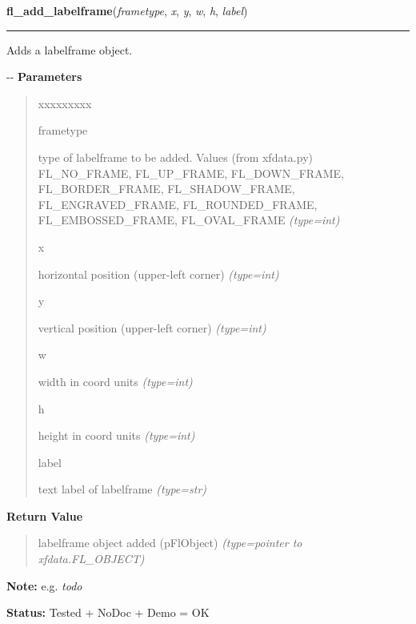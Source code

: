 \hspace{.8\funcindent}\begin{boxedminipage}{\funcwidth}

    \raggedright \textbf{fl\_add\_labelframe}(\textit{frametype}, \textit{x}, \textit{y}, \textit{w}, \textit{h}, \textit{label})

    \vspace{-1.5ex}

    \rule{\textwidth}{0.5\fboxrule}
\setlength{\parskip}{2ex}

Adds a labelframe object.

-{}-
\setlength{\parskip}{1ex}
      \textbf{Parameters}
      \vspace{-1ex}

      \begin{quote}
        \begin{Ventry}{xxxxxxxxx}

          \item[frametype]


type of labelframe to be added. Values (from xfdata.py) FL\_NO\_FRAME,
FL\_UP\_FRAME, FL\_DOWN\_FRAME, FL\_BORDER\_FRAME, FL\_SHADOW\_FRAME,
FL\_ENGRAVED\_FRAME, FL\_ROUNDED\_FRAME, FL\_EMBOSSED\_FRAME, FL\_OVAL\_FRAME
            {\it (type=int)}

          \item[x]


horizontal position (upper-left corner)
            {\it (type=int)}

          \item[y]


vertical position (upper-left corner)
            {\it (type=int)}

          \item[w]


width in coord units
            {\it (type=int)}

          \item[h]


height in coord units
            {\it (type=int)}

          \item[label]


text label of labelframe
            {\it (type=str)}

        \end{Ventry}

      \end{quote}

      \textbf{Return Value}
    \vspace{-1ex}

      \begin{quote}

labelframe object added (pFlObject)
      {\it (type=pointer to xfdata.FL\_OBJECT)}

      \end{quote}

\textbf{Note:} 
e.g. \emph{todo}


\textbf{Status:} 
Tested + NoDoc + Demo = OK


    \end{boxedminipage}

